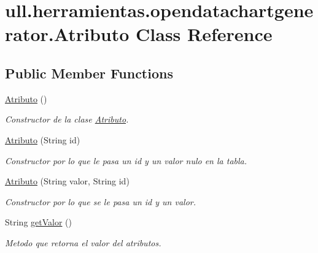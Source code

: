 \hypertarget{classull_1_1herramientas_1_1opendatachartgenerator_1_1_atributo}{}\section{ull.\+herramientas.\+opendatachartgenerator.\+Atributo Class Reference}
\label{classull_1_1herramientas_1_1opendatachartgenerator_1_1_atributo}
\subsection*{Public Member Functions}
\begin{DoxyCompactItemize}
\item 
\mbox{\label{classull_1_1herramientas_1_1opendatachartgenerator_1_1_atributo_a685f8ef3be4e6abfab4c1ce66d69ef1e}} 
\mbox{\hyperlink{classull_1_1herramientas_1_1opendatachartgenerator_1_1_atributo_a685f8ef3be4e6abfab4c1ce66d69ef1e}{Atributo}} ()
\begin{DoxyCompactList}\small\item\em Constructor de la clase \mbox{\hyperlink{classull_1_1herramientas_1_1opendatachartgenerator_1_1_atributo}{Atributo}}. \end{DoxyCompactList}\item 
\mbox{\hyperlink{classull_1_1herramientas_1_1opendatachartgenerator_1_1_atributo_ae0119f87842fa00c5d2c4b6ba6fb8346}{Atributo}} (String id)
\begin{DoxyCompactList}\small\item\em Constructor por lo que le pasa un id y un valor nulo en la tabla. \end{DoxyCompactList}\item 
\mbox{\hyperlink{classull_1_1herramientas_1_1opendatachartgenerator_1_1_atributo_a25e5efe2746d3237f3f2db3b09c37829}{Atributo}} (String valor, String id)
\begin{DoxyCompactList}\small\item\em Constructor por lo que se le pasa un id y un valor. \end{DoxyCompactList}\item 
String \mbox{\hyperlink{classull_1_1herramientas_1_1opendatachartgenerator_1_1_atributo_a891a12eff15e773b44cb2a36490f03c9}{get\+Valor}} ()
\begin{DoxyCompactList}\small\item\em Metodo que retorna el valor del atributos. \end{DoxyCompactList}\item 

\end{DoxyCompactItemize}
